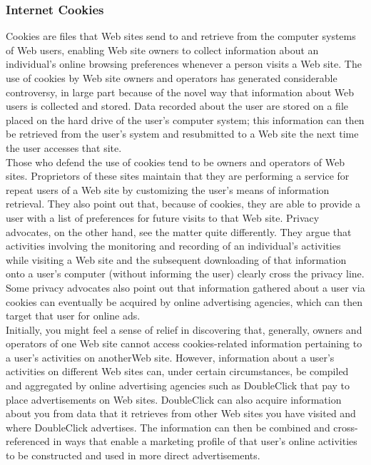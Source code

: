 \documentclass[12pt]{article}
\theoremstyle{definition}
\begin{document}
\subsubsection{Internet Cookies}
Cookies are files that Web sites send to and retrieve from the computer systems of Web
users, enabling Web site owners to collect information about an individual’s online
browsing preferences whenever a person visits a Web site. The use of cookies by Web site
owners and operators has generated considerable controversy, in large part because of
the novel way that information about Web users is collected and stored. Data recorded
about the user are stored on a file placed on the hard drive of the user’s computer system;
this information can then be retrieved from the user’s system and resubmitted to a Web
site the next time the user accesses that site.\\
Those who defend the use of cookies tend to be owners and operators of Web sites.
Proprietors of these sites maintain that they are performing a service for repeat users of a
Web site by customizing the user’s means of information retrieval. They also point out that, because of cookies, they are able to provide a user with a list of preferences for
future visits to that Web site. Privacy advocates, on the other hand, see the matter quite
differently. They argue that activities involving the monitoring and recording of an
individual’s activities while visiting a Web site and the subsequent downloading of that
information onto a user’s computer (without informing the user) clearly cross the privacy
line. Some privacy advocates also point out that information gathered about a user via
cookies can eventually be acquired by online advertising agencies, which can then target
that user for online ads.\\
Initially, you might feel a sense of relief in discovering that, generally, owners and
operators of one Web site cannot access cookies-related information pertaining to a
user’s activities on anotherWeb site. However, information about a user’s activities on
different Web sites can, under certain circumstances, be compiled and aggregated by
online advertising agencies such as DoubleClick that pay to place advertisements on
Web sites. DoubleClick can also acquire information about you from data that it
retrieves from other Web sites you have visited and where DoubleClick advertises.
The information can then be combined and cross-referenced in ways that enable a
marketing profile of that user’s online activities to be constructed and used in more
direct advertisements.\\
\end{document}

